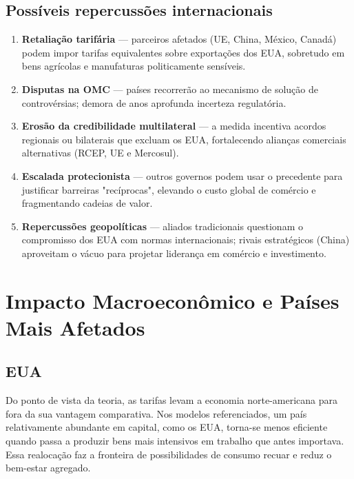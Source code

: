 \documentclass[a4paper,12pt]{article}[abntex2]
\begin{document}
\subsection*{\textbf{Possíveis repercussões internacionais}}

\begin{enumerate}
    \item \textbf{Retaliação tarifária} — parceiros afetados (UE, China, México, Canadá) podem impor tarifas equivalentes sobre exportações dos EUA, sobretudo em bens agrícolas e manufaturas politicamente sensíveis.  
    \item \textbf{Disputas na OMC} — países recorrerão ao mecanismo de solução de controvérsias; demora de anos aprofunda incerteza regulatória.  
    \item \textbf{Erosão da credibilidade multilateral} — a medida incentiva acordos regionais ou bilaterais que excluam os EUA, fortalecendo alianças comerciais alternativas (RCEP, UE e Mercosul).  
    \item \textbf{Escalada protecionista} — outros governos podem usar o precedente para justificar barreiras "recíprocas", elevando o custo global de comércio e fragmentando cadeias de valor.  
    \item \textbf{Repercussões geopolíticas} — aliados tradicionais questionam o compromisso dos EUA com normas internacionais; rivais estratégicos (China) aproveitam o vácuo para projetar liderança em comércio e investimento.
\end{enumerate}

\section*{\textbf{Impacto Macroeconômico e Países Mais Afetados}}

\subsection*{\textbf{EUA}}

Do ponto de vista da teoria, as tarifas levam a economia norte-americana para fora da sua vantagem comparativa. Nos modelos referenciados, um país relativamente abundante em capital, como os EUA, torna-se menos eficiente quando passa a produzir bens mais intensivos em trabalho que antes importava. Essa realocação faz a fronteira de possibilidades de consumo recuar e reduz o bem-estar agregado. 
\end{document}
